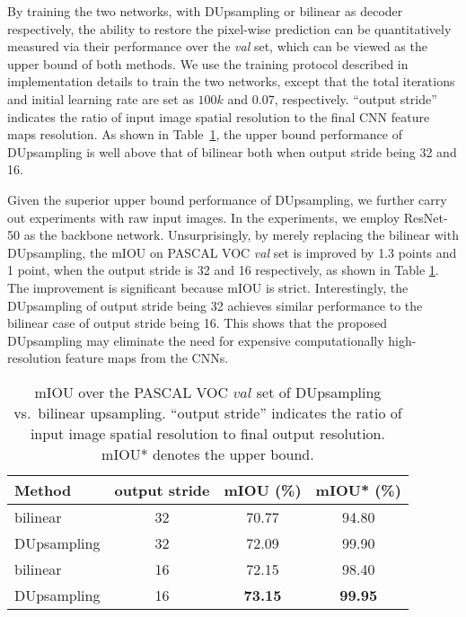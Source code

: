 \documentclass[10pt,twocolumn,letterpaper]{article}
\newcommand{\1}{{\mathbbm{1}}}
\begin{document}
By training the two networks, with DUpsampling or bilinear as decoder respectively, the ability to restore the pixel-wise prediction can be quantitatively measured via their performance over the {\it val} set, which can be viewed as the upper bound of both methods. We use the training protocol described in implementation details to train the two networks, except that the total iterations and initial learning rate are set as $100k$ and 0.07, respectively.  ``output stride'' indicates the ratio of input image spatial resolution to the final CNN feature maps resolution. As shown in Table~\ref{table:pca_vs_bilinear}, the upper bound performance of DUpsampling is well above that of bilinear both when output stride being 32 and  16.

Given the superior upper bound performance of DUpsampling, we further carry out experiments with raw input images. In the experiments, we employ ResNet-50 as the backbone network. Unsurprisingly, by merely replacing the bilinear with DUpsampling, the mIOU on PASCAL VOC {\it val} set is improved by 1.3 points and 1 point, when the output stride is 32 and 16 respectively, as shown in Table \ref{table:pca_vs_bilinear}. The improvement is significant because mIOU is strict. Interestingly, the DUpsampling of output stride being 32 achieves similar performance to the bilinear case of output stride being 16.
This shows that the proposed DUpsampling may eliminate the need for expensive computationally high-resolution feature maps from the  CNNs.

\begin{table}
\begin{center}
\small
\begin{tabular}{ l|c|c|c  }
\hline
Method & output stride & mIOU (\%) & mIOU* (\%)\\
\hline\hline
bilinear & 32 & 70.77 & 94.80\\
DUpsampling & 32 & 72.09 & 99.90 \\
bilinear & 16 & 72.15 & 98.40 \\
DUpsampling & 16 & \textbf{73.15} & \textbf{99.95} \\
\hline
\end{tabular}
\end{center}
\vspace{-0.3cm}
\caption{mIOU over the PASCAL VOC $val$ set of DUpsampling vs.\ bilinear upsampling.  ``output stride'' indicates the ratio of input image spatial resolution to final output resolution. mIOU* denotes the upper bound.}
\label{table:pca_vs_bilinear}
\vspace{-0.5cm}
\end{table}
\end{document}
